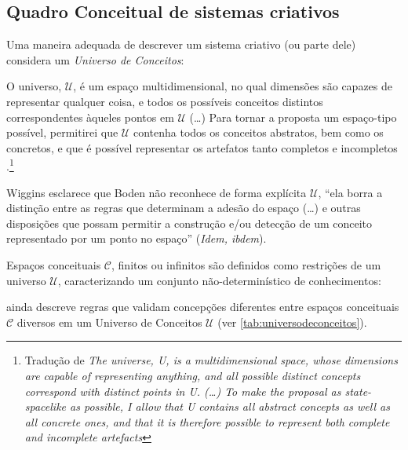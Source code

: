 \subsection{Quadro Conceitual de sistemas criativos}\label{sec:csf}

Uma maneira adequada de descrever um sistema criativo (ou parte dele) considera um \emph{Universo de Conceitos}:

\begin{citacao}
O universo, $\mathcal{U}$, é um espaço multidimensional, no qual dimensões são capazes de representar qualquer coisa, e todos os possíveis conceitos distintos correspondentes àqueles pontos em $\mathcal{U}$ (\ldots) Para tornar a proposta um espaço-tipo possível, permitirei que $\mathcal{U}$ contenha todos os conceitos abstratos, bem como os concretos, e que é possível representar os artefatos tanto completos e incompletos \cite[p.~451]{wiggins_framework_2006}.\footnote{Tradução de \emph{The universe, U, is a multidimensional space, whose dimensions are capable of representing anything, and all possible distinct concepts correspond with distinct points in U. (\ldots) To make the proposal as state-spacelike as possible, I allow that U contains all abstract concepts as well as all concrete ones, and that it is therefore possible to represent both complete and incomplete artefacts}}
\end{citacao}

Wiggins esclarece que Boden não reconhece de forma explícita $\mathcal{U}$, ``ela borra a distinção entre as regras que determinam a adesão do espaço (\ldots) e outras disposições que possam permitir a construção e/ou detecção de um conceito representado por um ponto no espaço'' (\emph{Idem, ibdem}).

Espaços conceituais $\mathcal{C}$, finitos ou infinitos são definidos como restrições de um universo $\mathcal{U}$, caracterizando um conjunto não-determinístico de conhecimentos: 

 ainda descreve regras que validam concepções diferentes entre espaços conceituais $\mathcal{C}$ diversos em um Universo de Conceitos $\mathcal{U}$ (ver \autoref{tab:universodeconceitos}).

